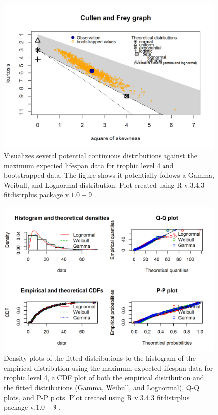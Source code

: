 \documentclass[oneside,12pt,final]{sty/ucthesis-CA2012}
\let\cite\citep                             %
\begin{document}
\begin{mainmatter}
\begin{figure}[H]
     \centering
       \includegraphics[width=.8\textwidth]{fig/cullen_frey_l4}
    \caption{Visualizes several potential continuous distributions against the maximum expected lifespan data for trophic level 4 and bootstrapped data. The figure shows it potentially follows a Gamma, Weibull, and Lognormal distribution. Plot created using R v.3.4.3 \cite{Rcite} fitdistrplus package v.$1.0-9$ \cite{fitdistrplus}. }
    \label{cf_l4}
\end{figure}

\begin{figure}[H]
     \centering
       \includegraphics[width=.8\textwidth]{fig/gof_l4}
    \caption{Density plots of the fitted distributions to the histogram of the empirical distribution using the maximum expected lifespan data for trophic level 4, a CDF plot of both the empirical distribution and the fitted distributions (Gamma, Weibull, and Lognormal), Q-Q plots, and P-P plots. Plot created using R v.3.4.3 \cite{Rcite} fitdistrplus package v.$1.0-9$ \cite{fitdistrplus}. }
    \label{gof_l4}
\end{figure}



\end{mainmatter}
\end{document}
